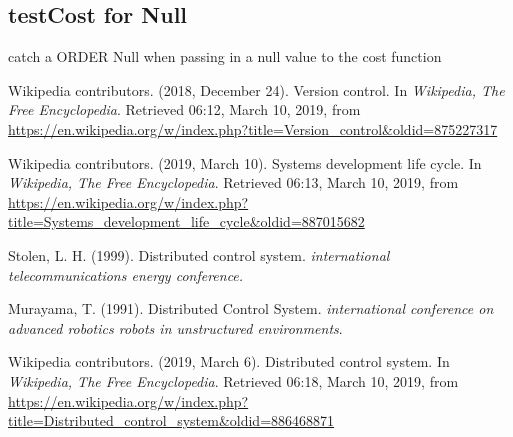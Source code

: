 \documentclass[a4paper]{report}
\begin{document}
\subsection{testCost for Null}
\par catch a ORDER Null when passing in a null value to the cost function
\begin{thebibliography}{A}

Wikipedia contributors. (2018, December 24). Version control. In \emph{Wikipedia, The Free Encyclopedia}. Retrieved 06:12, March 10, 2019, from \url{https://en.wikipedia.org/w/index.php?title=Version_control&oldid=875227317}

Wikipedia contributors. (2019, March 10). Systems development life cycle. In \emph{Wikipedia, The Free Encyclopedia}. Retrieved 06:13, March 10, 2019, from \url{https://en.wikipedia.org/w/index.php?title=Systems_development_life_cycle&oldid=887015682}

Stolen, L. H. (1999). Distributed control system. \emph{international telecommunications energy conference.}

Murayama, T. (1991). Distributed Control System. \emph{international conference on advanced robotics robots in unstructured environments}.

Wikipedia contributors. (2019, March 6). Distributed control system. In \emph{Wikipedia, The Free Encyclopedia}. Retrieved 06:18, March 10, 2019, from \url{https://en.wikipedia.org/w/index.php?title=Distributed_control_system&oldid=886468871}

\end{thebibliography}
\end{document}

